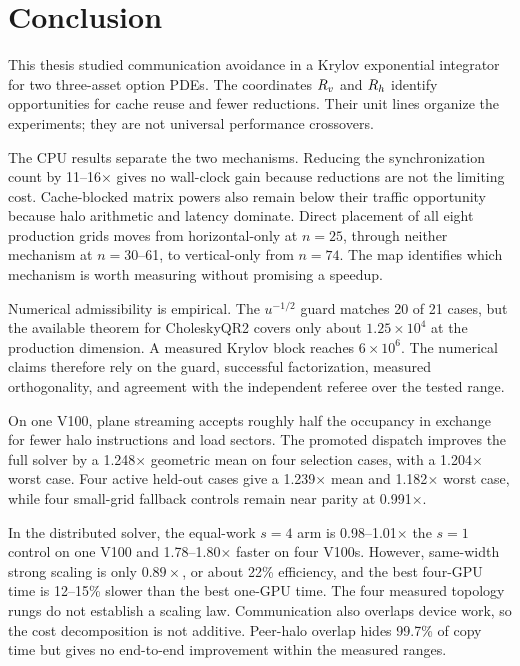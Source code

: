 \section{Conclusion}\label{sec:conclusion}

This thesis studied communication avoidance in a Krylov exponential integrator for two three-asset option PDEs. The coordinates $R_v$ and $R_h$ identify opportunities for cache reuse and fewer reductions. Their unit lines organize the experiments; they are not universal performance crossovers.

The CPU results separate the two mechanisms. Reducing the synchronization count by 11--16$\times$ gives no wall-clock gain because reductions are not the limiting cost. Cache-blocked matrix powers also remain below their traffic opportunity because halo arithmetic and latency dominate. Direct placement of all eight production grids moves from horizontal-only at $n=25$, through neither mechanism at $n=30$--61, to vertical-only from $n=74$. The map identifies which mechanism is worth measuring without promising a speedup.

Numerical admissibility is empirical. The $u^{-1/2}$ guard matches 20 of 21 cases, but the available theorem for CholeskyQR2 covers only about $1.25\times10^4$ at the production dimension. A measured Krylov block reaches $6\times10^6$. The numerical claims therefore rely on the guard, successful factorization, measured orthogonality, and agreement with the independent referee over the tested range.

On one V100, plane streaming accepts roughly half the occupancy in exchange for fewer halo instructions and load sectors. The promoted dispatch improves the full solver by a 1.248$\times$ geometric mean on four selection cases, with a 1.204$\times$ worst case. Four active held-out cases give a 1.239$\times$ mean and 1.182$\times$ worst case, while four small-grid fallback controls remain near parity at 0.991$\times$.

In the distributed solver, the equal-work $s=4$ arm is 0.98--1.01$\times$ the $s=1$ control on one V100 and 1.78--1.80$\times$ faster on four V100s. However, same-width strong scaling is only $0.89\times$, or about 22\% efficiency, and the best four-GPU time is 12--15\% slower than the best one-GPU time. The four measured topology rungs do not establish a scaling law. Communication also overlaps device work, so the cost decomposition is not additive. Peer-halo overlap hides 99.7\% of copy time but gives no end-to-end improvement within the measured ranges.

